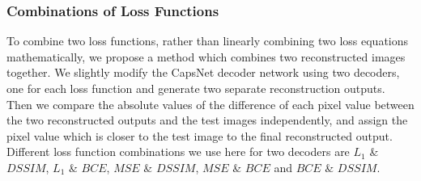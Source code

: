 \vspace{-0.5cm}
\subsubsection{Combinations of Loss Functions}
To combine two loss functions, rather than linearly combining two loss equations mathematically, we propose a method which combines two reconstructed images together. We slightly modify the CapsNet decoder network using two decoders, one for each loss function and generate two separate reconstruction outputs. Then we compare the absolute values of the difference of each pixel value between the two reconstructed outputs and the test images independently, and assign the pixel value which is closer to the test image to the final reconstructed output. Different loss function combinations we use here for two decoders are $L_1$  \&  $DSSIM$, $L_1$  \&  $BCE$, $MSE$  \&  $DSSIM$, $MSE$  \&  $BCE$ and $BCE$  \&  $DSSIM$.


%

